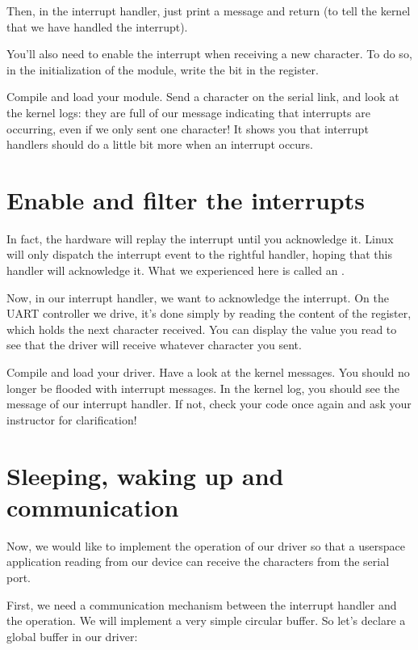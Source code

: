 Then, in the interrupt handler, just print a message and return
 (to tell the kernel that we have handled the
interrupt).

You'll also need to enable the interrupt when receiving a new
character. To do so, in the initialization of the module, write the
 bit in the  register.

Compile and load your module. Send a character on the serial link, and
look at the kernel logs: they are full of our message indicating that
interrupts are occurring, even if we only sent one character! It shows
you that interrupt handlers should do a little bit more when an
interrupt occurs.

\section{Enable and filter the interrupts}

In fact, the hardware will replay the interrupt until you acknowledge
it. Linux will only dispatch the interrupt event to the rightful
handler, hoping that this handler will acknowledge it. What we
experienced here is called an .

Now, in our interrupt handler, we want to acknowledge the
interrupt. On the UART controller we drive, it's done simply by
reading the content of the  register, which holds the
next character received. You can display the value you read to see
that the driver will receive whatever character you sent.

Compile and load your driver. Have a look at the kernel messages. You
should no longer be flooded with interrupt messages. In the kernel
log, you should see the message of our interrupt handler. If not,
check your code once again and ask your instructor for clarification!

\section{Sleeping, waking up and communication}

Now, we would like to implement the  operation of our
driver so that a userspace application reading from our device can
receive the characters from the serial port.

First, we need a communication mechanism between the interrupt handler
and the  operation. We will implement a very simple
circular buffer. So let's declare a global buffer in our driver:

